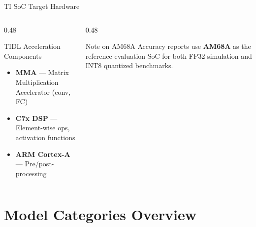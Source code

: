 \documentclass[aspectratio=169,12pt]{beamer}
\begin{document}
\begin{frame}{TI SoC Target Hardware}
\begin{center}
  \end{center}

  \vspace{0.2cm}
  \begin{columns}[T]
    \begin{column}{0.48\textwidth}
      \begin{block}{TIDL Acceleration Components}
        \begin{itemize}\footnotesize
          \item \textbf{MMA} — Matrix Multiplication Accelerator (conv, FC)
          \item \textbf{C7x DSP} — Element-wise ops, activation functions
          \item \textbf{ARM Cortex-A} — Pre/post-processing
        \end{itemize}
      \end{block}
    \end{column}
    \begin{column}{0.48\textwidth}
      \begin{alertblock}{Note on AM68A}
        \footnotesize Accuracy reports use \textbf{AM68A} as the reference
        evaluation SoC for both FP32 simulation and INT8 quantized benchmarks.
      \end{alertblock}
    \end{column}
  \end{columns}
\end{frame}

\section{Model Categories Overview}
\end{document}
